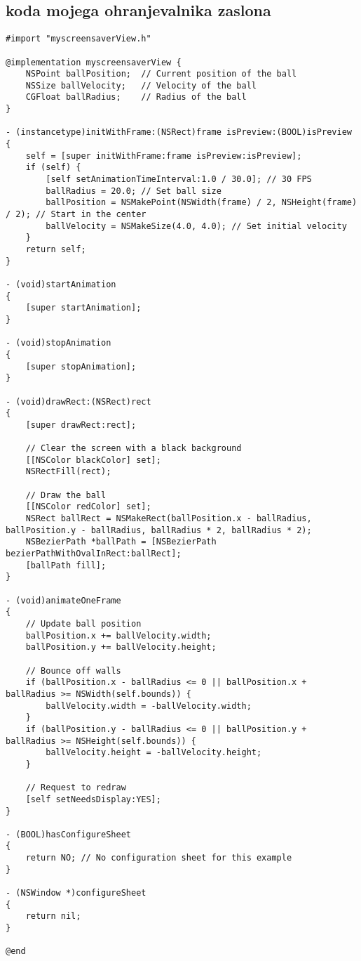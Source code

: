 \documentclass[11pt, oneside]{article}   	%
\begin{document}
\subsection{koda mojega ohranjevalnika zaslona}
\begin{verbatim}
#import "myscreensaverView.h"

@implementation myscreensaverView {
    NSPoint ballPosition;  // Current position of the ball
    NSSize ballVelocity;   // Velocity of the ball
    CGFloat ballRadius;    // Radius of the ball
}

- (instancetype)initWithFrame:(NSRect)frame isPreview:(BOOL)isPreview
{
    self = [super initWithFrame:frame isPreview:isPreview];
    if (self) {
        [self setAnimationTimeInterval:1.0 / 30.0]; // 30 FPS
        ballRadius = 20.0; // Set ball size
        ballPosition = NSMakePoint(NSWidth(frame) / 2, NSHeight(frame) / 2); // Start in the center
        ballVelocity = NSMakeSize(4.0, 4.0); // Set initial velocity
    }
    return self;
}

- (void)startAnimation
{
    [super startAnimation];
}

- (void)stopAnimation
{
    [super stopAnimation];
}

- (void)drawRect:(NSRect)rect
{
    [super drawRect:rect];

    // Clear the screen with a black background
    [[NSColor blackColor] set];
    NSRectFill(rect);

    // Draw the ball
    [[NSColor redColor] set];
    NSRect ballRect = NSMakeRect(ballPosition.x - ballRadius, ballPosition.y - ballRadius, ballRadius * 2, ballRadius * 2);
    NSBezierPath *ballPath = [NSBezierPath bezierPathWithOvalInRect:ballRect];
    [ballPath fill];
}

- (void)animateOneFrame
{
    // Update ball position
    ballPosition.x += ballVelocity.width;
    ballPosition.y += ballVelocity.height;

    // Bounce off walls
    if (ballPosition.x - ballRadius <= 0 || ballPosition.x + ballRadius >= NSWidth(self.bounds)) {
        ballVelocity.width = -ballVelocity.width;
    }
    if (ballPosition.y - ballRadius <= 0 || ballPosition.y + ballRadius >= NSHeight(self.bounds)) {
        ballVelocity.height = -ballVelocity.height;
    }

    // Request to redraw
    [self setNeedsDisplay:YES];
}

- (BOOL)hasConfigureSheet
{
    return NO; // No configuration sheet for this example
}

- (NSWindow *)configureSheet
{
    return nil;
}

@end
\end{verbatim}
\end{document}
